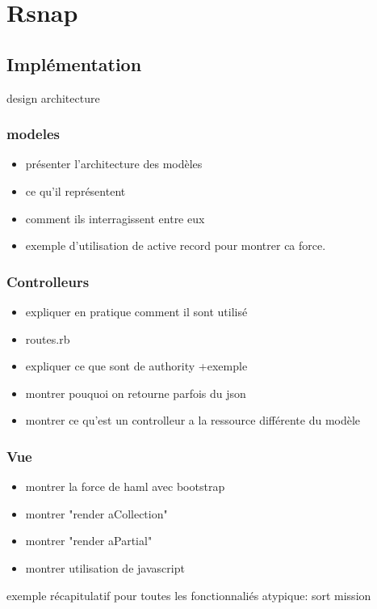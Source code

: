 \section{Rsnap}
\subsection{Implémentation}
design architecture

\subsubsection{modeles}
\begin{itemize}
  \item présenter l'architecture des modèles
  \item ce qu'il représentent
  \item comment ils interragissent entre eux
  \item exemple d'utilisation de active record pour montrer ca force.
\end{itemize}

\subsubsection{Controlleurs}
\begin{itemize}
  \item expliquer en pratique comment il sont utilisé
  \item routes.rb
  \item expliquer ce que sont de authority +exemple
  \item montrer pouquoi on retourne parfois du json
  \item montrer ce qu'est un controlleur a la ressource différente du modèle
\end{itemize}

\subsubsection{Vue}
\begin{itemize}
  \item montrer la force de haml avec bootstrap
  \item montrer "render aCollection"
  \item montrer "render aPartial"
  \item montrer utilisation de javascript
\end{itemize}

exemple récapitulatif pour toutes les fonctionnaliés atypique: sort mission

